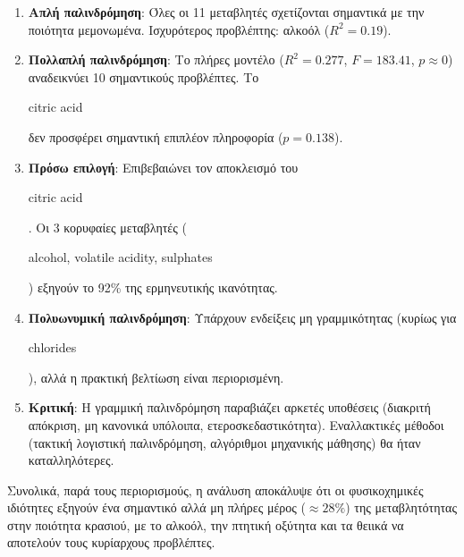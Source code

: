 \documentclass[12pt,a4paper]{article}
\begin{document}
\begin{enumerate}[nosep]
    \item \textbf{Απλή παλινδρόμηση}: Όλες οι 11 μεταβλητές σχετίζονται σημαντικά με την ποιότητα μεμονωμένα. Ισχυρότερος προβλέπτης: αλκοόλ ($R^2 = 0.19$).

    \item \textbf{Πολλαπλή παλινδρόμηση}: Το πλήρες μοντέλο ($R^2 = 0.277$, $F = 183.41$, $p \approx 0$) αναδεικνύει 10 σημαντικούς προβλέπτες. Το \begin{english}citric acid\end{english} δεν προσφέρει σημαντική επιπλέον πληροφορία ($p = 0.138$).

    \item \textbf{Πρόσω επιλογή}: Επιβεβαιώνει τον αποκλεισμό του \begin{english}citric acid\end{english}. Οι 3 κορυφαίες μεταβλητές (\begin{english}alcohol, volatile acidity, sulphates\end{english}) εξηγούν το 92\% της ερμηνευτικής ικανότητας.

    \item \textbf{Πολυωνυμική παλινδρόμηση}: Υπάρχουν ενδείξεις μη γραμμικότητας (κυρίως για \begin{english}chlorides\end{english}), αλλά η πρακτική βελτίωση είναι περιορισμένη.

    \item \textbf{Κριτική}: Η γραμμική παλινδρόμηση παραβιάζει αρκετές υποθέσεις (διακριτή απόκριση, μη κανονικά υπόλοιπα, ετεροσκεδαστικότητα). Εναλλακτικές μέθοδοι (τακτική λογιστική παλινδρόμηση, αλγόριθμοι μηχανικής μάθησης) θα ήταν καταλληλότερες.
\end{enumerate}

Συνολικά, παρά τους περιορισμούς, η ανάλυση αποκάλυψε ότι οι φυσικοχημικές ιδιότητες εξηγούν ένα σημαντικό αλλά μη πλήρες μέρος ($\approx 28\%$) της μεταβλητότητας στην ποιότητα κρασιού, με το αλκοόλ, την πτητική οξύτητα και τα θειικά να αποτελούν τους κυρίαρχους προβλέπτες.
\end{document}
